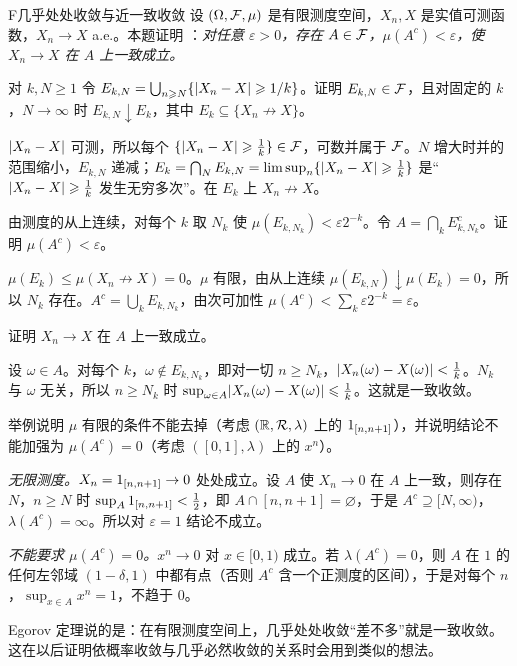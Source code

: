 \begin{probleme}{F}{几乎处处收敛与近一致收敛}
设 $(\Omega,\mathcal{F},\mu)$ 是有限测度空间，$X_n,X$ 是实值可测函数，$X_n\to X$ a.e.。本题证明 ：\emph{对任意 $\varepsilon>0$，存在 $A\in\mathcal{F}$，$\mu(A^c)<\varepsilon$，使 $X_n\to X$ 在 $A$ 上一致成立。}
\begin{questions}
\item 对 $k,N\geqslant1$ 令 $E_{k,N}=\bigcup_{n\geqslant N}\{\lvert X_n-X\rvert\geqslant1/k\}$。证明 $E_{k,N}\in\mathcal{F}$，且对固定的 $k$，$N\to\infty$ 时 $E_{k,N}\downarrow E_k$，其中 $E_k\subseteq\{X_n\not\to X\}$。
\begin{solution}
$\lvert X_n-X\rvert$ 可测，所以每个 $\{\lvert X_n-X\rvert\geqslant\frac1k\}\in\mathcal{F}$，可数并属于 $\mathcal{F}$。$N$ 增大时并的范围缩小，$E_{k,N}$ 递减；$E_k=\bigcap_NE_{k,N}=\limsup_n\{\lvert X_n-X\rvert\geqslant\frac1k\}$ 是“$\lvert X_n-X\rvert\geqslant\frac1k$ 发生无穷多次”。在 $E_k$ 上 $X_n\not\to X$。
\end{solution}
\item 由测度的从上连续，对每个 $k$ 取 $N_k$ 使 $\mu(E_{k,N_k})<\varepsilon2^{-k}$。令 $A=\bigcap_kE_{k,N_k}^c$。证明 $\mu(A^c)<\varepsilon$。
\begin{solution}
$\mu(E_k)\leqslant\mu(X_n\not\to X)=0$。$\mu$ 有限，由从上连续 $\mu(E_{k,N})\downarrow\mu(E_k)=0$，所以 $N_k$ 存在。$A^c=\bigcup_kE_{k,N_k}$，由次可加性 $\mu(A^c)<\sum_k\varepsilon2^{-k}=\varepsilon$。
\end{solution}
\item 证明 $X_n\to X$ 在 $A$ 上一致成立。
\begin{solution}
设 $\omega\in A$。对每个 $k$，$\omega\notin E_{k,N_k}$，即对一切 $n\geqslant N_k$，$\lvert X_n(\omega)-X(\omega)\rvert<\frac1k$。$N_k$ 与 $\omega$ 无关，所以 $n\geqslant N_k$ 时 $\sup_{\omega\in A}\lvert X_n(\omega)-X(\omega)\rvert\leqslant\frac1k$。这就是一致收敛。
\end{solution}
\item 举例说明 $\mu$ 有限的条件不能去掉（考虑 $(\mathbb{R},\mathcal{R},\lambda)$ 上的 $1_{[n,n+1]}$），并说明结论不能加强为 $\mu(A^c)=0$（考虑 $([0,1],\lambda)$ 上的 $x^n$）。
\begin{solution}
\emph{无限测度。}$X_n=1_{[n,n+1]}\to0$ 处处成立。设 $A$ 使 $X_n\to0$ 在 $A$ 上一致，则存在 $N$，$n\geqslant N$ 时 $\sup_A1_{[n,n+1]}<\frac12$，即 $A\cap[n,n+1]=\varnothing$，于是 $A^c\supseteq[N,\infty)$，$\lambda(A^c)=\infty$。所以对 $\varepsilon=1$ 结论不成立。

\emph{不能要求 $\mu(A^c)=0$。}$x^n\to0$ 对 $x\in[0,1)$ 成立。若 $\lambda(A^c)=0$，则 $A$ 在 $1$ 的任何左邻域 $(1-\delta,1)$ 中都有点（否则 $A^c$ 含一个正测度的区间），于是对每个 $n$，$\sup_{x\in A}x^n=1$，不趋于 $0$。

Egorov 定理说的是：在有限测度空间上，几乎处处收敛“差不多”就是一致收敛。这在以后证明依概率收敛与几乎必然收敛的关系时会用到类似的想法。
\end{solution}
\end{questions}
\end{probleme}
